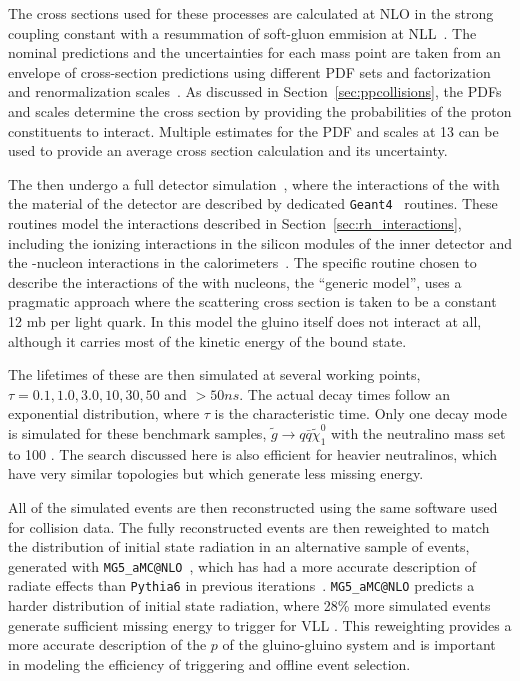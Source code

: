 The cross sections used for these processes are calculated at \ac{NLO} in the strong coupling constant with a resummation of soft-gluon emmision at \ac{NLL}~\cite{Beenakker:1996ch,Kulesza:2008jb,Kulesza:2009kq,Beenakker:2009ha,Beenakker:2011fu}.
The nominal predictions and the uncertainties for each mass point are taken from an envelope of cross-section predictions using different \ac{PDF} sets and factorization and renormalization scales~\cite{Kramer:2012bx}.
As discussed in Section~\ref{sec:ppcollisions}, the \acp{PDF} and scales determine the cross section by providing the probabilities of the proton constituents to interact.
Multiple estimates for the \ac{PDF} and scales at 13 \TeV can be used to provide an average cross section calculation and its uncertainty.

The \rhadrons then undergo a full detector simulation~\cite{SOFT-2010-01}, where the interactions of the \rhadrons with the material of the detector are described by dedicated \texttt{Geant4}~\cite{GEANT4} routines. 
These routines model the interactions described in Section~\ref{sec:rh_interactions}, including the ionizing interactions in the silicon modules of the inner detector and the \rhadron-nucleon interactions in the calorimeters~\cite{Mackeprang:2006gx, Mackeprang:2009ad}.
The specific routine chosen to describe the interactions of the \rhadrons with nucleons, the ``generic model'', uses a pragmatic approach where the scattering cross section is taken to be a constant 12 mb per light quark.
In this model the gluino itself does not interact at all, although it carries most of the kinetic energy of the bound state.

The lifetimes of these \rhadrons are then simulated at several working points, $\tau = 0.1, 1.0, 3.0, 10, 30, 50$ and $> 50 ns$.
The actual decay times follow an exponential distribution, where $\tau$ is the characteristic time.
Only one decay mode is simulated for these benchmark samples, $\tilde{g} \rightarrow q\bar{q}\tilde{\chi}_1^0$ with the neutralino mass set to 100 \GeV.
The search discussed here is also efficient for heavier neutralinos, which have very similar topologies but which generate less missing energy.

All of the simulated events are then reconstructed using the same software used for collision data.
The fully reconstructed events are then reweighted to match the distribution of initial state radiation in an alternative sample of events, generated with \texttt{MG5\_aMC@NLO}~\cite{madgraph}, which has had a more accurate description of radiate effects than \texttt{Pythia6} in previous iterations~\cite{SUSY-2014-09}.
\texttt{MG5\_aMC@NLO} predicts a harder distribution of initial state radiation, where 28\% more simulated events generate sufficient missing energy to trigger for \ac{VLL} \rhadrons.
This reweighting provides a more accurate description of the $p$ of the gluino-gluino system and is important in modeling the efficiency of triggering and offline event selection.


